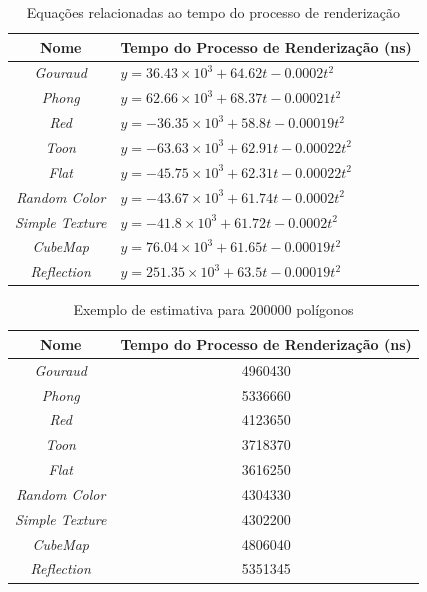 	\begin{table}[ht]
	\centering	
	\begin{tabularx}{0.9\textwidth}{cX}
		\toprule
		\textbf{Nome} & \textbf{Tempo do Processo de Renderização (ns)}  \\
		\midrule
		\textit{Gouraud} &  $y = 36.43 \times 10^3 + 64.62t - 0.0002t^2$\\
		\textit{Phong} &   $y = 62.66 \times 10^3 + 68.37t - 0.00021t^2$\\
		\textit{Red} & $y = -36.35 \times 10^3 + 58.8t - 0.00019t^2$\\
		\textit{Toon} & $y = -63.63 \times 10^3 + 62.91t - 0.00022t^2$\\
		\textit{Flat} & $y = -45.75 \times 10^3 + 62.31t - 0.00022t^2$\\
		\textit{Random Color} & $y = -43.67 \times 10^3 + 61.74t - 0.0002t^2$\\
		\textit{Simple Texture} & $y = -41.8 \times 10^3 + 61.72t - 0.0002t^2$\\
		\textit{CubeMap} & $y = 76.04 \times 10^3 + 61.65t - 0.00019t^2$\\
		\textit{Reflection} & $y = 251.35 \times 10^3 + 63.5t - 0.00019t^2$ \\
		
		\bottomrule
	\end{tabularx}
	\caption{Equações relacionadas ao tempo do processo de renderização}
	\label{eqrender}
	\end{table}

	\begin{table}[ht]
	\centering	
	\begin{tabularx}{0.9\textwidth}{cc}
		\toprule
		\textbf{Nome} & \textbf{Tempo do Processo de Renderização (ns)}  \\
		\midrule
		\textit{Gouraud} &  4960430\\
		\textit{Phong} &   5336660\\
		\textit{Red} & 4123650\\
		\textit{Toon} & 3718370\\
		\textit{Flat} & 3616250\\
		\textit{Random Color} & 4304330\\
		\textit{Simple Texture} & 4302200\\
		\textit{CubeMap} & 4806040\\
		\textit{Reflection} & 5351345\\
	
	
		\bottomrule
	\end{tabularx}
	\caption{Exemplo de estimativa para 200000 polígonos}
	\label{estimativa}
	\end{table}

